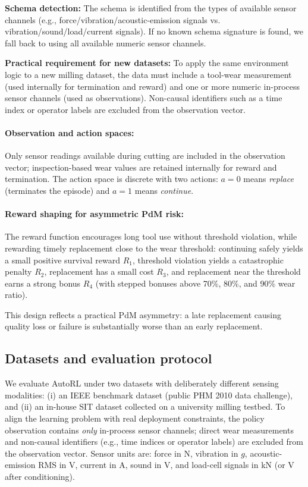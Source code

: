 \documentclass[sn-basic]{sn-jnl} %
\begin{document}
\textbf{Schema detection:}
The schema is identified from the types of available sensor channels (e.g., force/vibration/acoustic-emission signals vs. vibration/sound/load/current signals). If no known schema signature is found, we fall back to using all available numeric sensor channels.

\textbf{Practical requirement for new datasets:}
To apply the same environment logic to a new milling dataset, the data must include a tool-wear measurement (used internally for termination and reward) and one or more numeric in-process sensor channels (used as observations). Non-causal identifiers such as a time index or operator labels are excluded from the observation vector.

\paragraph{Observation and action spaces:}
Only sensor readings available during cutting are included in the observation vector; inspection-based wear values are retained internally for reward and termination. The action space is discrete with two actions: $a=0$ means \emph{replace} (terminates the episode) and $a=1$ means \emph{continue}.

\paragraph{Reward shaping for asymmetric PdM risk:}
The reward function encourages long tool use without threshold violation, while rewarding timely replacement close to the wear threshold: continuing safely yields a small positive survival reward $R_1$, threshold violation yields a catastrophic penalty $R_2$, replacement has a small cost $R_3$, and replacement near the threshold earns a strong bonus $R_4$ (with stepped bonuses above 70\%, 80\%, and 90\% wear ratio).

This design reflects a practical PdM asymmetry: a late replacement causing quality loss or failure is substantially worse than an early replacement.

\subsection{Datasets and evaluation protocol} \label{sec:experiment} 

We evaluate AutoRL under two datasets with deliberately different sensing modalities: (i) an IEEE benchmark dataset (public PHM 2010 data challenge), and (ii) an in-house SIT dataset collected on a university milling testbed. To align the learning problem with real deployment constraints, the policy observation contains \emph{only} in-process sensor channels; direct wear measurements and non-causal identifiers (e.g., time indices or operator labels) are excluded from the observation vector. Sensor units are: force in N, vibration in $g$, acoustic-emission RMS in V, current in A, sound in V, and load-cell signals in kN (or V after conditioning).
\end{document}
